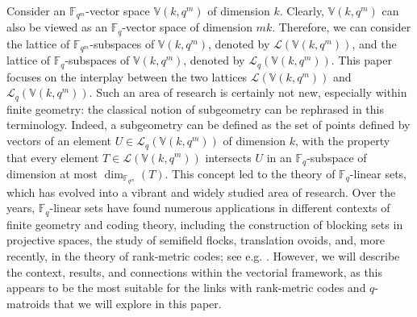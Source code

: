 \documentclass[11pt]{amsart}
\newcommand{\F}{{\mathbb F}}
\begin{document}
Consider an $\F_{q^m}$-vector space $\mathbb{V}(k, q^m)$ of dimension $k$. Clearly, $\mathbb{V}(k, q^m)$ can also be viewed as an $\F_q$-vector space of dimension $mk$. Therefore, we can consider the lattice of $\F_{q^m}$-subspaces of $\mathbb{V}(k, q^m)$, denoted by ${\mathcal L}(\mathbb{V}(k, q^m))$, and the lattice of $\F_q$-subspaces of $\mathbb{V}(k, q^m)$, denoted by ${\mathcal L}_q(\mathbb{V}(k, q^m))$.
This paper focuses on the interplay between the two lattices ${\mathcal L}(\mathbb{V}(k, q^m))$ and ${\mathcal L}_q(\mathbb{V}(k, q^m))$.
Such an area of research is certainly not new, especially within finite geometry: the classical notion of subgeometry can be rephrased in this terminology. Indeed, a subgeometry can be defined as the set of points defined by vectors of an element $U \in {\mathcal L}_q(\mathbb{V}(k, q^m))$ of dimension $k$, with the property that every element $T \in {\mathcal L}(\mathbb{V}(k, q^m))$ intersects $U$ in an $\F_q$-subspace of dimension at most $\dim_{\F_{q^m}}(T)$. This concept led to the theory of $\F_q$-linear sets, which has evolved into a vibrant and widely studied area of research. Over the years, $\F_q$-linear sets have found numerous applications in different contexts of finite geometry and coding theory, including the construction of blocking sets in projective spaces, the study of semifield flocks, translation ovoids, and, more recently, in the theory of rank-metric codes; see e.g. \cite{polverino2010linear,lavrauw2015field}. However, we will describe the context, results, and connections within the vectorial framework, as this appears to be the most suitable for the links with rank-metric codes and $q$-matroids that we will explore in this paper. 
\end{document}
